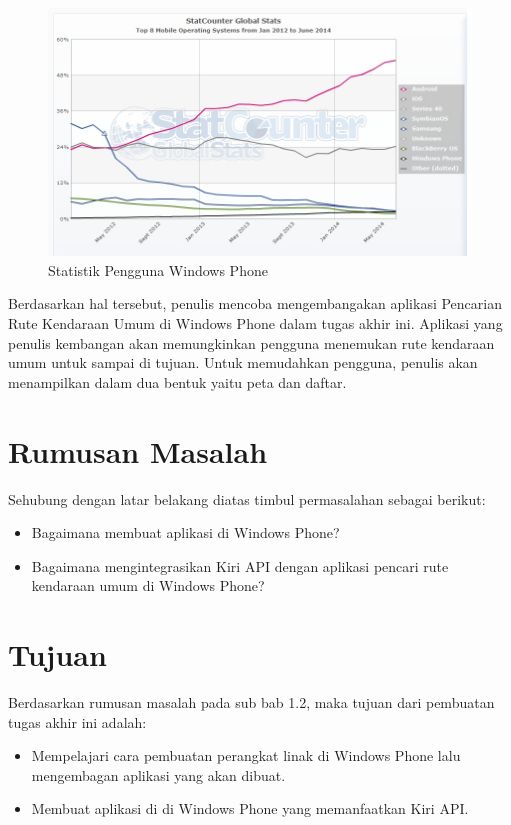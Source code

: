 \clearpage 

\begin{figure}[h]
	\centering
		\includegraphics[scale=0.5]{Gambar/StatCounter} 
	\caption{Statistik Pengguna Windows Phone}
	\label{fig:StatCounter}
\end{figure}

Berdasarkan hal tersebut, penulis mencoba mengembangakan aplikasi Pencarian Rute Kendaraan Umum di Windows Phone dalam tugas akhir ini. Aplikasi yang penulis kembangan akan memungkinkan pengguna menemukan rute kendaraan umum untuk sampai di tujuan. Untuk memudahkan pengguna, penulis akan menampilkan dalam dua bentuk yaitu peta dan daftar. 

\section{Rumusan Masalah}
\label{sec:rumusan_masalah}
Sehubung dengan latar belakang diatas timbul permasalahan sebagai berikut:
\begin{itemize}
	\item Bagaimana membuat aplikasi di Windows Phone?
	\item Bagaimana mengintegrasikan Kiri API dengan aplikasi pencari rute kendaraan umum di Windows Phone?
\end{itemize}

\section{Tujuan}
\label{sec:tujuan}
Berdasarkan rumusan masalah pada sub bab 1.2, maka tujuan dari pembuatan tugas akhir ini adalah:
\begin{itemize}
	\item Mempelajari cara pembuatan perangkat linak di Windows Phone lalu mengembagan aplikasi yang akan dibuat.
	\item Membuat aplikasi di di Windows Phone yang memanfaatkan Kiri API.
\end{itemize}

